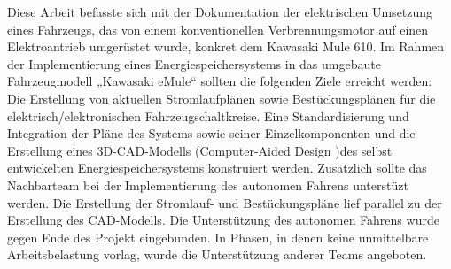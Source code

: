 Diese Arbeit befasste sich mit der Dokumentation der elektrischen Umsetzung eines Fahrzeugs, das von einem konventionellen Verbrennungsmotor auf einen Elektroantrieb umgerüstet wurde, konkret dem Kawasaki Mule 610.
Im Rahmen der Implementierung eines Energiespeichersystems in das umgebaute Fahrzeugmodell „Kawasaki eMule“ sollten die folgenden Ziele erreicht werden: Die Erstellung von aktuellen Stromlaufplänen sowie  Bestückungsplänen für die elektrisch/elektronischen Fahrzeugschaltkreise. Eine Standardisierung und Integration der Pläne des Systems sowie seiner Einzelkomponenten und die Erstellung eines 3D-CAD-Modells (Computer-Aided Design )des selbst entwickelten Energiespeichersystems konstruiert werden. Zusätzlich sollte das Nachbarteam bei der Implementierung des autonomen Fahrens unterstüzt werden. \newline
Die Erstellung der Stromlauf- und Bestückungspläne lief parallel zu der Erstellung des CAD-Modells. Die Unterstützung des autonomen Fahrens wurde gegen Ende des Projekt eingebunden.
In Phasen, in denen keine unmittelbare Arbeitsbelastung vorlag, wurde die Unterstützung anderer Teams angeboten.\newline
